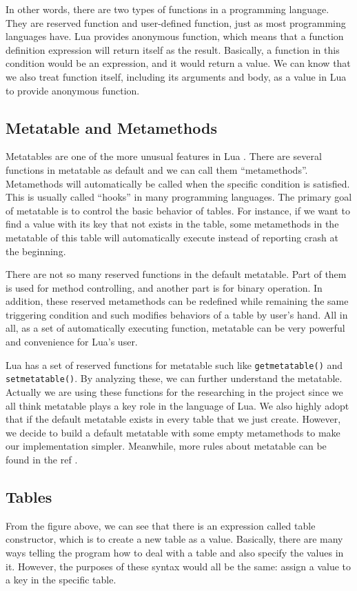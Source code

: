 \documentclass{article}
\begin{document}
In other words, there are two types of functions in a programming language. They are reserved function and user-defined function, just as most programming languages have. Lua provides anonymous function, which means that a function definition expression will return itself as the result. Basically, a function in this condition would be an expression, and it would return a value. We can know that we also treat function itself, including its arguments and body, as a value in Lua to provide anonymous function.

\subsection{Metatable and Metamethods}
Metatables are one of the more unusual features in Lua . There are several functions in metatable as default and we can call them ``metamethods''. Metamethods will automatically be called when the specific condition is satisfied. This is usually called ``hooks'' in many programming languages. The primary goal of metatable is to control the basic behavior of tables. For instance, if we want to find a value with its key that not exists in the table, some metamethods in the metatable of this table will automatically execute instead of reporting crash at the beginning.

There are not so many reserved functions in the default metatable. Part of them is used for method controlling, and another part is for binary operation. In addition, these reserved metamethods can be redefined while remaining the same triggering condition and such modifies behaviors of a table by user's hand. All in all, as a set of automatically executing function, metatable can be very powerful and convenience for Lua's user.

Lua has a set of reserved functions for metatable such like {\tt getmetatable()} and {\tt setmetatable()}. By analyzing these, we can further understand the metatable. Actually we are using these functions for the researching in the project since we all think metatable plays a key role in the language of Lua. We also highly adopt that if the default metatable exists in every table that we just create. However, we decide to build a default metatable with some empty metamethods to make our implementation simpler. Meanwhile, more rules about metatable can be found in the ref \cite{LRM}.

\subsection{Tables}
From the figure above, we can see that there is an expression called table constructor, which is to create a new table as a value. Basically, there are many ways telling the program how to deal with a table and also specify the values in it. However, the purposes of these syntax would all be the same: assign a value to a key in the specific table.
\end{document}
